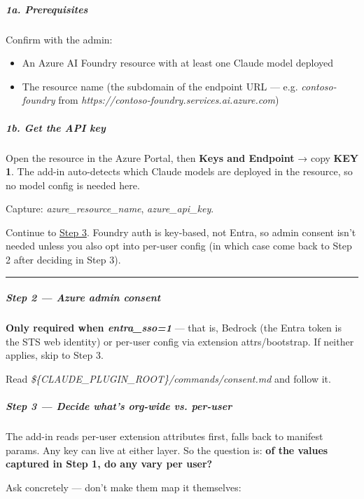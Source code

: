 \documentclass[11pt]{article}
\begin{document}
\subparagraph{1a. Prerequisites}\mbox{}\par

Confirm with the admin:

\begin{itemize}[leftmargin=*,itemsep=2pt,topsep=2pt]
\item {} An Azure AI Foundry resource with at least one Claude model deployed
\item {} The resource name (the subdomain of the endpoint URL — e.g. \emph{contoso-foundry} from \emph{https://contoso-foundry.services.ai.azure.com})
\end{itemize}

\subparagraph{1b. Get the API key}\mbox{}\par

Open the resource in the Azure Portal, then \textbf{Keys and Endpoint} → copy \textbf{KEY 1}. The add-in auto-detects which Claude models are deployed in the resource, so no model config is needed here.


Capture: \emph{azure\_\allowbreak{}resource\_\allowbreak{}name}, \emph{azure\_\allowbreak{}api\_\allowbreak{}key}.


Continue to \href{\#step-3--decide-whats-org-wide-vs-per-user}{Step 3}. Foundry auth is key-based, not Entra, so admin consent isn't needed unless you also opt into per-user config (in which case come back to Step 2 after deciding in Step 3).


\vspace{0.5em}\hrule\vspace{0.5em}

\subparagraph{Step 2 — Azure admin consent}\mbox{}\par

\textbf{Only required when \emph{entra\_\allowbreak{}sso=1}} — that is, Bedrock (the Entra token is the STS web identity) or per-user config via extension attrs/bootstrap. If neither applies, skip to Step 3.


Read \emph{\$\{CLAUDE\_\allowbreak{}PLUGIN\_\allowbreak{}ROOT\}/commands/consent.md} and follow it.


\subparagraph{Step 3 — Decide what's org-wide vs. per-user}\mbox{}\par

The add-in reads per-user extension attributes first, falls back to manifest params. Any key can live at either layer. So the question is: \textbf{of the values captured in Step 1, do any vary per user?}


Ask concretely — don't make them map it themselves:
\end{document}
